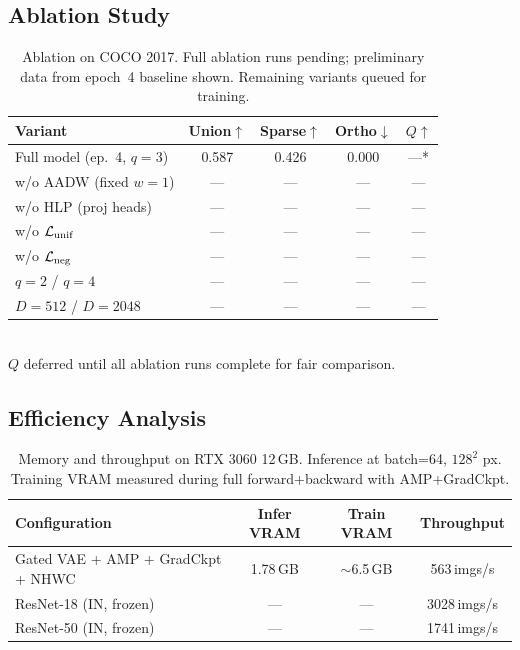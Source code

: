 \documentclass[10pt,twocolumn]{article}
\begin{document}
\subsection{Ablation Study}
\label{sec:ablation}

\begin{table}[h]
\centering\small
\caption{Ablation on COCO 2017. Full ablation runs pending; preliminary data from epoch~4 baseline shown. Remaining variants queued for training.}
\label{tab:ablation}
\begin{tabular}{lcccc}
\toprule
Variant & Union$\uparrow$ & Sparse$\uparrow$ & Ortho$\downarrow$ & $Q\uparrow$ \\
\midrule
Full model (ep.~4, $q{=}3$)    & 0.587 & 0.426 & 0.000 & ---* \\
w/o AADW (fixed $w{=}1$)       & ---   & ---   & ---   & --- \\
w/o HLP (proj heads)           & ---   & ---   & ---   & --- \\
w/o $\mathcal{L}_{\rm unif}$   & ---   & ---   & ---   & --- \\
w/o $\mathcal{L}_{\rm neg}$    & ---   & ---   & ---   & --- \\
$q{=}2$ / $q{=}4$             & ---   & ---   & ---   & --- \\
$D{=}512$ / $D{=}2048$        & ---   & ---   & ---   & --- \\
\bottomrule
\end{tabular}
\smallskip\\
{\footnotesize *$Q$ deferred until all ablation runs complete for fair comparison.}
\end{table}

\subsection{Efficiency Analysis}

\begin{table}[h]
\centering\small
\caption{Memory and throughput on RTX 3060 12\,GB. Inference at batch=64,
$128^2$ px. Training VRAM measured during full forward+backward with AMP+GradCkpt.}
\label{tab:efficiency2}
\begin{tabular}{lccc}
\toprule
Configuration & Infer VRAM & Train VRAM & Throughput \\
\midrule
Gated VAE + AMP + GradCkpt + NHWC & 1.78\,GB & $\sim$6.5\,GB & 563\,imgs/s \\
ResNet-18 (IN, frozen)             & ---       & ---           & 3028\,imgs/s \\
ResNet-50 (IN, frozen)             & ---       & ---           & 1741\,imgs/s \\
\bottomrule
\end{tabular}
\end{table}
\end{document}
